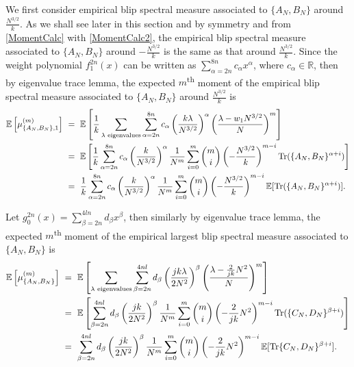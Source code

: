 \documentclass[11pt,reqno]{amsart}
\numberwithin{equation}{section}
\theoremstyle{plain}
\newcommand{\E}[1]{\mathbb{E}[#1]}
\begin{document}

We first consider empirical blip spectral measure associated to $\{A_N, B_N\}$ around $\frac{N^{3/2}}{k}$. As we shall see later in this section and by symmetry and from \ref{MomentCalc} with \ref{MomentCalc2}, the empirical blip spectral measure associated to $\{A_N, B_N\}$ around $-\frac{N^{3/2}}{k}$ is the same as that around $\frac{N^{3/2}}{k}$. Since the weight polynomial $f_1^{2n}(x)$ can be written as $\sum_{\alpha=2n}^{8n}c_\alpha x^\alpha$, where $c_\alpha\in\mathbb{R}$, then by eigenvalue trace lemma, the expected $m$\textsuperscript{th} moment of the empirical blip spectral measure associated to $\{A_N,B_N\}$ around $\frac{N^{3/2}}{k}$ is
\begin{align}
\mathbb{E}\left[\mu_{\{A_N,B_N\},1}^{(m)}\right] &\ = \ \mathbb{E}\left[\frac{1}{k}\sum_{\lambda\textup{ eigenvalues}}\sum_{\alpha=2n}^{8n}c_\alpha\left(\frac{k\lambda}{N^{3/2}}\right)^\alpha\left(\frac{\lambda-w_1N^{3/2}}{N}\right)^{m}\right] \nonumber \\
&\ = \ \mathbb{E}\left[\frac{1}{k}\sum_{\alpha=2n}^{8n}c_\alpha\left(\frac{k}{N^{3/2}}\right)^\alpha\frac{1}{N^m}\sum_{i=0}^m \binom{m}{i}\left(-\frac{N^{3/2}}{k}\right)^{m-i}\textup{Tr}(\{A_N,B_N\}^{\alpha+i})\right] \nonumber \\
&\ = \ \frac{1}{k}\sum_{\alpha=2n}^{8n}c_\alpha\left(\frac{k}{N^{3/2}}\right)^\alpha\frac{1}{N^m}\sum_{i=0}^m \binom{m}{i}\left(-\frac{N^{3/2}}{k}\right)^{m-i}\mathbb{E}[\textup{Tr}(\{A_N,B_N\}^{\alpha+i})]\label{MomentCalc}.
\end{align}

Let $g_0^{2n}(x)=\sum_{\beta=2n}^{4ln}d_\beta x^{\beta}$, then similarly by eigenvalue trace lemma, the expected $m$\textsuperscript{th} moment of the empirical largest blip spectral measure associated to $\{A_N, B_N\}$ is
\begin{align}\label{momentOfCNDN}
\mathbb{E}\left[\mu^{(m)}_{\{A_N, B_N\}}\right] &\ = \ \mathbb{E}\left[\sum_{\lambda\textup{ eigenvalues}} \sum_{\beta=2n}^{4nl}d_\beta\left(\frac{jk\lambda}{2N^2}\right)^\beta \left(\frac{\lambda-\frac{2}{jk}N^2}{N}\right)^m\right] \nonumber \\
&\ = \ \mathbb{E}\left[\sum_{\beta=2n}^{4nl}d_\beta\left(\frac{jk}{2N^2}\right)^\beta\frac{1}{N^m} \sum_{i=0}^m\binom{m}{i}\left(-\frac{2}{jk}N^2\right)^{m-i}\textup{Tr}(\{C_N, D_N\}^{\beta+i})\right] \nonumber \\
&\ = \ \sum_{\beta=2n}^{4nl}d_\beta \left(\frac{jk}{2N^2}\right)^\beta \frac{1}{N^m}\sum_{i=0}^m\binom{m}{i}\left(-\frac{2}{jk}N^2\right)^{m-i}\E{\text{Tr}\{C_N,D_N\}^{\beta+i}}.
\end{align}
\end{document}
